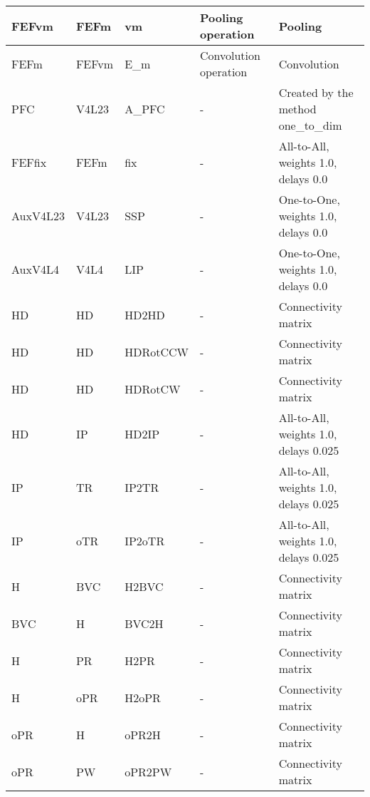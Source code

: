 \documentclass{article}
\begin{document}
\begin{xltabular}{\linewidth}{|l|l|l|X|X|}
    FEFvm & FEFm & vm & Pooling operation &
    Pooling \\ \hline

    FEFm & FEFvm & E_m & Convolution operation &
    Convolution \\ \hline

    PFC & V4L23 & A\_PFC & - &
    Created by the method one\_to\_dim \\ \hline

    FEFfix & FEFm & fix & - &
    All-to-All, weights 1.0, delays 0.0 \\ \hline

    AuxV4L23 & V4L23 & SSP & - &
    One-to-One, weights 1.0, delays 0.0 \\ \hline

    AuxV4L4 & V4L4 & LIP & - &
    One-to-One, weights 1.0, delays 0.0 \\ \hline

    HD & HD & HD2HD & - &
    Connectivity matrix \\ \hline

    HD & HD & HDRotCCW & - &
    Connectivity matrix \\ \hline

    HD & HD & HDRotCW & - &
    Connectivity matrix \\ \hline

    HD & IP & HD2IP & - &
    All-to-All, weights 1.0, delays 0.025 \\ \hline

    IP & TR & IP2TR & - &
    All-to-All, weights 1.0, delays 0.025 \\ \hline

    IP & oTR & IP2oTR & - &
    All-to-All, weights 1.0, delays 0.025 \\ \hline

    H & BVC & H2BVC & - &
    Connectivity matrix \\ \hline

    BVC & H & BVC2H & - &
    Connectivity matrix \\ \hline

    H & PR & H2PR & - &
    Connectivity matrix \\ \hline

    H & oPR & H2oPR & - &
    Connectivity matrix \\ \hline

    oPR & H & oPR2H & - &
    Connectivity matrix \\ \hline

    oPR & PW & oPR2PW & - &
    Connectivity matrix \\ \hline


\end{xltabular}
\end{document}
